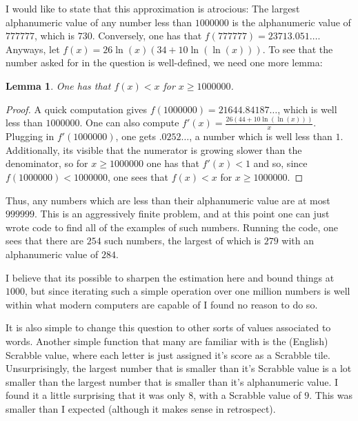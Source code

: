 \documentclass[11pt]{article}
\newtheorem{lemma}[theorem]{Lemma}
\theoremstyle{definition}
\begin{document}
I would like to state that this approximation is atrocious: The largest alphanumeric value of any number less than $1000000$ is the alphanumeric value of $777777$, which is $730$.  Conversely, one has that $f(777777) = 23713.051\ldots$.  Anyways, let $f(x) = 26\ln(x)(34+10\ln(\ln(x)))$.  To see that the number asked for in the question is well-defined, we need one more lemma:
\begin{lemma}
One has that $f(x) < x$ for $x \geq 1000000$.
\end{lemma}
\begin{proof}
A quick computation gives $f(1000000) = 21644.84187\ldots$, which is well less than $1000000$.  One can also compute $f'(x) = \frac{26(44+10\ln(\ln(x)))}{x}.$  Plugging in $f'(1000000)$, one gets $.0252\ldots$, a number which is well less than $1$.  Additionally, its visible that the numerator is growing slower than the denominator, so for $x \geq 1000000$ one has that $f'(x) < 1$ and so, since $f(1000000) < 1000000$, one sees that $f(x) < x$ for $x \geq 1000000$.
\end{proof}

Thus, any numbers which are less than their alphanumeric value are at most $999999$.  This is an aggressively finite problem, and at this point one can just wrote code to find all of the examples of such numbers.  Running the code, one sees that there are $254$ such numbers, the largest of which is $279$ with an alphanumeric value of $284$.

I believe that its possible to sharpen the estimation here and bound things at $1000$, but since iterating such a simple operation over one million numbers is well within what modern computers are capable of I found no reason to do so.

It is also simple to change this question to other sorts of values associated to words.  Another simple function that many are familiar with is the (English) Scrabble value, where each letter is just assigned it's score as a Scrabble tile.  Unsurprisingly, the largest number that is smaller than it's Scrabble value is a lot smaller than the largest number that is smaller than it's alphanumeric value.  I found it a little surprising that it was only $8$, with a Scrabble value of $9$.  This was smaller than I expected (although it makes sense in retrospect).
\end{document}
